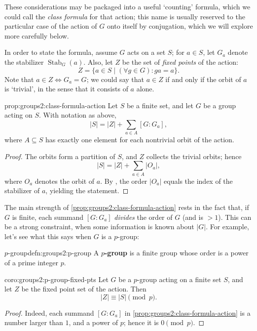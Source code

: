 These considerations may be packaged into a useful `counting' formula,
which we could call the \emph{class formula} for that action; this
name is usually reserved to the particular case of the action of $G$
onto itself by conjugation, which we will explore more carefully
below.

In order to state the formula, assume $G$ acts on a set $S$; for
$a \in S$, let $G_a$ denote the stabilizer
$\operatorname{Stab}_G(a)$. Also, let $Z$ be the set of \emph{fixed
  points} of the action:
\[
  Z = \{a \in S \mid (\forall g \in G) : ga = a\}.
\]
Note that $a \in Z \iff G_a = G$; we could say that $a \in Z$ if and
only if the orbit of $a$ is `trivial', in the sense that it consists
of $a$ alone.

\begin{prop}{}{prop:groups2:class-formula-action}
  Let $S$ be a finite set, and let $G$ be a group acting on $S$. With
  notation as above,
  \[
    |S| = |Z| + \sum_{a \in A} [G : G_a],
  \]
  where $A \subseteq S$ has exactly one element for each nontrivial
  orbit of the action.
\end{prop}
\begin{proof}
  The orbits form a partition of $S$, and $Z$ collects the trivial
  orbits; hence
  \[
    |S| = |Z| + \sum_{a \in A} |O_a|,
  \]
  where $O_a$ denotes the orbit of $a$. By
  , the order $|O_a|$
  equals the index of the stabilizer of $a$, yielding the statement.
\end{proof}

The main strength of \cref{prop:groups2:class-formula-action} rests in
the fact that, if $G$ is finite, each summand $[G : G_a]$
\emph{divides} the order of $G$ (and is $> 1$). This can be a strong
constraint, when some information is known about $|G|$. For example,
let's see what this says when $G$ is a $p$-group:

\begin{defn}{$p$-group}{defn:groups2:p-group}
  A \textbf{$p$-group} is a finite group whose order is a power of a
  prime integer $p$.
\end{defn}

\begin{coro}{}{coro:groups2:p-group-fixed-pts}
  Let $G$ be a $p$-group acting on a finite set $S$, and let $Z$ be
  the fixed point set of the action. Then
  \[
    |Z| \equiv |S| \pmod{p}.
  \]
\end{coro}
\begin{proof}
  Indeed, each summand $[G : G_a]$ in
  \cref{prop:groups2:class-formula-action} is a number larger than
  $1$, and a power of $p$; hence it is $0 \pmod{p}$.
\end{proof}


